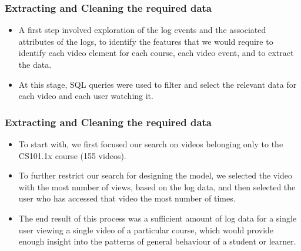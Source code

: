 \documentclass[12pt,xcolor=dvipsnames]{beamer}
\begin{document}
\begin{frame}[t]
\frametitle{Extracting and Cleaning the required data}

\begin{itemize}
\item A first step involved exploration of the log events and the associated attributes of the logs, to identify the features that we would require to identify each video element for each course, each video event, and to extract the data.

\item At this stage, SQL queries were used to filter and select the relevant data for each video and each user watching it.

\end{itemize}

\end{frame}
\begin{frame}[t]
\frametitle{Extracting and Cleaning the required data}

\begin{itemize}

\item To start with, we first focused our search on videos belonging only to the CS101.1x course (155 videos).

\item To further restrict our search for designing the model, we selected the video with the most number of views, based on the log data, and then selected the user who has accessed that video the most number of times.

\item The end result of this process was a sufficient amount of log data for a single user viewing a single video of a particular course, which would provide enough insight into the patterns of general behaviour of a student or learner.

\end{itemize}

\end{frame}
\end{document}

